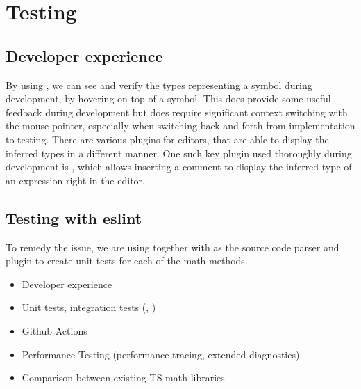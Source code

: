 \chapter{Testing}

\section{Developer experience}

By using , we can see and verify the types representing a symbol during development, by hovering on top of a symbol. This does provide some useful feedback during development but does require significant context switching with the mouse pointer, especially when switching back and forth from implementation to testing. There are various plugins for editors, that are able to display the inferred types in a different manner. One such key plugin used thoroughly during development is  \cite{theroxVscodetwoslashqueries2023}, which allows inserting a  comment to display the inferred type of an expression right in the editor.


\section{Testing with eslint}


To remedy the issue, we are using  together with  as the source code parser and  plugin to create unit tests for each of the math methods.

\begin{itemize}
  \item Developer experience
  \item Unit tests, integration tests (, )
  \item Github Actions
  \item Performance Testing (performance tracing, extended diagnostics)
  \item Comparison between existing TS math libraries
\end{itemize}